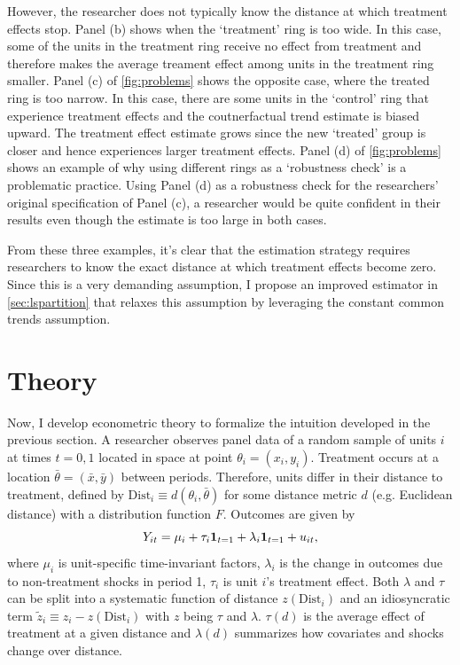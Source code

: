 \documentclass[12pt]{article}
\newcommand{\dist}{\text{Dist}}
\begin{document}
However, the researcher does not typically know the distance at which treatment effects stop. Panel (b) shows when the `treatment' ring is too wide. In this case, some of the units in the treatment ring receive no effect from treatment and therefore makes the average treament effect among units in the treatment ring smaller. Panel (c) of \autoref{fig:problems} shows the opposite case, where the treated ring is too narrow. In this case, there are some units in the `control' ring that experience treatment effects and the coutnerfactual trend estimate is biased upward. The treatment effect estimate grows since the new `treated' group is closer and hence experiences larger treatment effects. Panel (d) of \autoref{fig:problems} shows an example of why using different rings as a `robustness check' is a problematic practice. Using Panel (d) as a robustness check for the researchers' original specification of Panel (c), a researcher would be quite confident in their results even though the estimate is too large in both cases.

From these three examples, it's clear that the estimation strategy requires researchers to know the exact distance at which treatment effects become zero. Since this is a very demanding assumption, I propose an improved estimator in \autoref{sec:lspartition} that relaxes this assumption by leveraging the constant common trends assumption. 




\section{Theory}

Now, I develop econometric theory to formalize the intuition developed in the previous section. A researcher observes panel data of a random sample of units $i$ at times $t = 0, 1$ located in space at point $\theta_i = (x_i, y_i)$. Treatment occurs at a location $\bar{\theta} = (\bar{x}, \bar{y})$ between periods. Therefore, units differ in their distance to treatment, defined by $\dist_i \equiv d(\theta_i, \bar{\theta})$ for some distance metric $d$ (e.g. Euclidean distance) with a distribution function $F$. Outcomes are given by 
\begin{equation}
    Y_{it} = \mu_i + \tau_i \mathbf{1}_{t = 1} + \lambda_i \mathbf{1}_{t=1} +u_{it},    
\end{equation}
where $\mu_i$ is unit-specific time-invariant factors, $\lambda_i$ is the change in outcomes due to non-treatment shocks in period 1, $\tau_i$ is unit $i$'s treatment effect. Both $\lambda$ and $\tau$ can be split into a systematic function of distance $z(\dist_i)$ and an idiosyncratic term $\tilde{z}_i \equiv z_i - z(\dist_i)$ with $z$ being $\tau$ and $\lambda$. $\tau(d)$ is the average effect of treatment at a given distance and $\lambda(d)$ summarizes how covariates and shocks change over distance.
\end{document}
